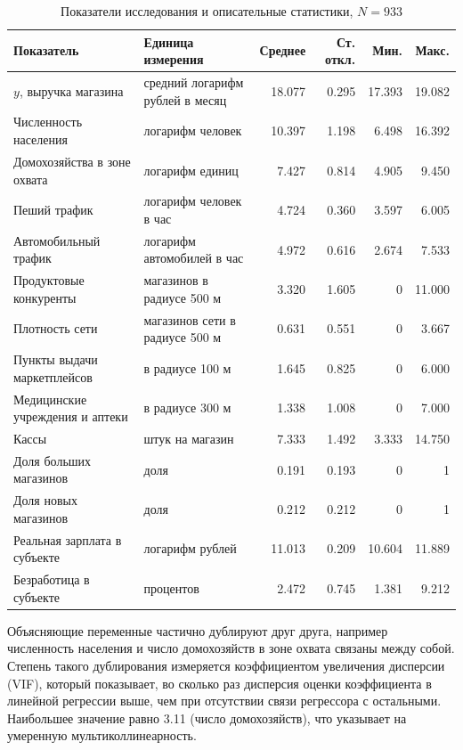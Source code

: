 \documentclass[12pt, a4paper]{article}
\newcommand{\tablesource}{\par\vspace{1mm}{\footnotesize Источник: расчеты авторов по данным X5 Group, Росстата и GeoNames.}}
\begin{document}
\begin{table}[H]
    \centering
    \footnotesize
    \renewcommand{\arraystretch}{1.1}
    \caption{Показатели исследования и описательные статистики, $N = 933$}
    \label{tab:descriptive}
    \begin{tabularx}{\textwidth}{>{\raggedright\arraybackslash}X >{\raggedright\arraybackslash}p{4.3cm} rrrr}
        \toprule
        \textbf{Показатель} & \textbf{Единица измерения} & \textbf{Среднее} & \textbf{Ст. откл.} & \textbf{Мин.} & \textbf{Макс.} \\
        \midrule
        $y$, выручка магазина & средний логарифм рублей в месяц & 18.077 & 0.295 & 17.393 & 19.082 \\
        Численность населения & логарифм человек & 10.397 & 1.198 & 6.498 & 16.392 \\
        Домохозяйства в зоне охвата & логарифм единиц & 7.427 & 0.814 & 4.905 & 9.450 \\
        Пеший трафик & логарифм человек в час & 4.724 & 0.360 & 3.597 & 6.005 \\
        Автомобильный трафик & логарифм автомобилей в час & 4.972 & 0.616 & 2.674 & 7.533 \\
        Продуктовые конкуренты & магазинов в радиусе 500 м & 3.320 & 1.605 & 0 & 11.000 \\
        Плотность сети & магазинов сети в радиусе 500 м & 0.631 & 0.551 & 0 & 3.667 \\
        Пункты выдачи маркетплейсов & в радиусе 100 м & 1.645 & 0.825 & 0 & 6.000 \\
        Медицинские учреждения и аптеки & в радиусе 300 м & 1.338 & 1.008 & 0 & 7.000 \\
        Кассы & штук на магазин & 7.333 & 1.492 & 3.333 & 14.750 \\
        Доля больших магазинов & доля & 0.191 & 0.193 & 0 & 1 \\
        Доля новых магазинов & доля & 0.212 & 0.212 & 0 & 1 \\
        Реальная зарплата в субъекте & логарифм рублей & 11.013 & 0.209 & 10.604 & 11.889 \\
        Безработица в субъекте & процентов & 2.472 & 0.745 & 1.381 & 9.212 \\
        \bottomrule
    \end{tabularx}
    \tablesource
\end{table}

Объясняющие переменные частично дублируют друг друга, например численность населения и число
домохозяйств в зоне охвата связаны между собой. Степень такого дублирования измеряется
коэффициентом увеличения дисперсии (VIF), который показывает, во сколько раз дисперсия оценки
коэффициента в линейной регрессии выше, чем при отсутствии связи регрессора с остальными.
Наибольшее значение равно 3.11 (число домохозяйств), что указывает на умеренную
мультиколлинеарность.
\end{document}
